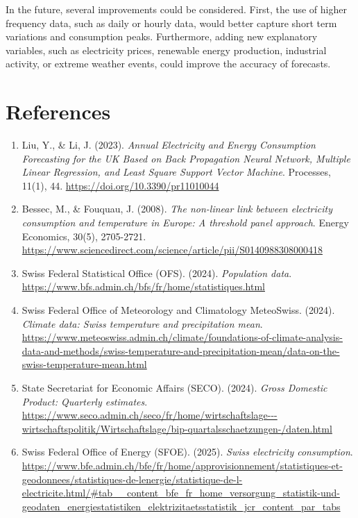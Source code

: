\documentclass[11pt,a4paper]{article}
\begin{document}
In the future, several improvements could be considered. First, the use of higher frequency data, such as daily or hourly data, would better capture short term variations and consumption peaks. Furthermore, adding new explanatory variables, such as electricity prices, renewable energy production, industrial activity, or extreme weather events, could improve the accuracy of forecasts.
\newpage
\section*{References}

\begin{enumerate}
    \item Liu, Y., \& Li, J. (2023). \textit{Annual Electricity and Energy Consumption Forecasting for the UK Based on Back Propagation Neural Network, Multiple Linear Regression, and Least Square Support Vector Machine}. Processes, 11(1), 44. \url{https://doi.org/10.3390/pr11010044}
    
    \item Bessec, M., \& Fouquau, J. (2008). \textit{The non-linear link between electricity consumption and temperature in Europe: A threshold panel approach}. Energy Economics, 30(5), 2705-2721. \url{https://www.sciencedirect.com/science/article/pii/S0140988308000418}
    
    \item Swiss Federal Statistical Office (OFS). (2024). \textit{Population data}. \url{https://www.bfs.admin.ch/bfs/fr/home/statistiques.html}
    
    \item Swiss Federal Office of Meteorology and Climatology MeteoSwiss. (2024). \textit{Climate data: Swiss temperature and precipitation mean}. \url{https://www.meteoswiss.admin.ch/climate/foundations-of-climate-analysis-data-and-methods/swiss-temperature-and-precipitation-mean/data-on-the-swiss-temperature-mean.html}
    
    \item State Secretariat for Economic Affairs (SECO). (2024). \textit{Gross Domestic Product: Quarterly estimates}. \url{https://www.seco.admin.ch/seco/fr/home/wirtschaftslage---wirtschaftspolitik/Wirtschaftslage/bip-quartalsschaetzungen-/daten.html}
    
    \item Swiss Federal Office of Energy (SFOE). (2025). \textit{Swiss electricity consumption}. \url{https://www.bfe.admin.ch/bfe/fr/home/approvisionnement/statistiques-et-geodonnees/statistiques-de-lenergie/statistique-de-l-electricite.html/#tab__content_bfe_fr_home_versorgung_statistik-und-geodaten_energiestatistiken_elektrizitaetsstatistik_jcr_content_par_tabs}


\end{enumerate}
\end{document}
